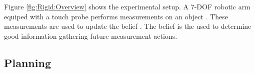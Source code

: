 \documentclass[../thesis.tex]{subfiles}
\begin{document}

Figure \ref{fig:Rigid:Overview} shows the experimental setup.
A 7-DOF robotic arm equiped with a touch probe performs measurements on an object .
These measurements are used to update the belief . The belief is the used to determine good information gathering future measurement actions.


\subsection{Planning}
\end{document}
